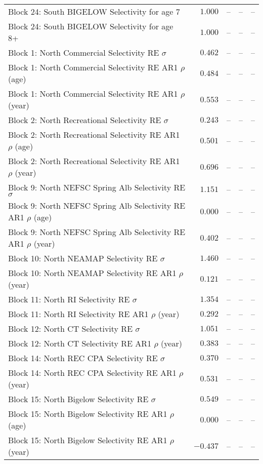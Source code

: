 \documentclass[
]{article}
\begin{document}
\begin{landscape}
\begin{longtable}[t]{lrrrr}
Block 24: South BIGELOW Selectivity for age 7 & $1.000$ & -- & -- & --\\
Block 24: South BIGELOW Selectivity for age 8+ & $1.000$ & -- & -- & --\\
Block 1: North Commercial Selectivity RE $\sigma$ & $0.462$ & -- & -- & --\\
\addlinespace
Block 1: North Commercial Selectivity RE AR1 $\rho$ (age) & $0.484$ & -- & -- & --\\
Block 1: North Commercial Selectivity RE AR1 $\rho$ (year) & $0.553$ & -- & -- & --\\
Block 2: North Recreational Selectivity RE $\sigma$ & $0.243$ & -- & -- & --\\
Block 2: North Recreational Selectivity RE AR1 $\rho$ (age) & $0.501$ & -- & -- & --\\
Block 2: North Recreational Selectivity RE AR1 $\rho$ (year) & $0.696$ & -- & -- & --\\
\addlinespace
Block 9: North NEFSC Spring Alb Selectivity RE $\sigma$ & $1.151$ & -- & -- & --\\
Block 9: North NEFSC Spring Alb Selectivity RE AR1 $\rho$ (age) & $0.000$ & -- & -- & --\\
Block 9: North NEFSC Spring Alb Selectivity RE AR1 $\rho$ (year) & $0.402$ & -- & -- & --\\
Block 10: North NEAMAP Selectivity RE $\sigma$ & $1.460$ & -- & -- & --\\
Block 10: North NEAMAP Selectivity RE AR1 $\rho$ (year) & $0.121$ & -- & -- & --\\
\addlinespace
Block 11: North RI Selectivity RE $\sigma$ & $1.354$ & -- & -- & --\\
Block 11: North RI Selectivity RE AR1 $\rho$ (year) & $0.292$ & -- & -- & --\\
Block 12: North CT Selectivity RE $\sigma$ & $1.051$ & -- & -- & --\\
Block 12: North CT Selectivity RE AR1 $\rho$ (year) & $0.383$ & -- & -- & --\\
Block 14: North REC CPA Selectivity RE $\sigma$ & $0.370$ & -- & -- & --\\
\addlinespace
Block 14: North REC CPA Selectivity RE AR1 $\rho$ (year) & $0.531$ & -- & -- & --\\
Block 15: North Bigelow Selectivity RE $\sigma$ & $0.549$ & -- & -- & --\\
Block 15: North Bigelow Selectivity RE AR1 $\rho$ (age) & $0.000$ & -- & -- & --\\
Block 15: North Bigelow Selectivity RE AR1 $\rho$ (year) & $-0.437$ & -- & -- & --\\

\end{longtable}
\end{landscape}
\end{document}
